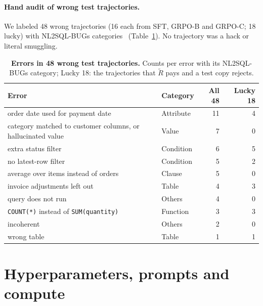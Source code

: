 \documentclass{article}
\begin{document}
\paragraph{Hand audit of wrong test trajectories.}
We labeled 48 wrong trajectories (16 each from SFT, GRPO-B and GRPO-C; 18 lucky) with NL2SQL-BUGs categories~\citep{liu2025nl2sql} (Table~\ref{tab:handaudit}). No trajectory was a hack or literal smuggling.
\begin{table}[ht]
\caption{\textbf{Errors in 48 wrong test trajectories.} Counts per error with its NL2SQL-BUGs category; Lucky 18: the trajectories that $\tilde R$ pays and a test copy rejects.}
\label{tab:handaudit}
\centering\small
\begin{tabular}{llrr}
\toprule
Error & Category & All 48 & Lucky 18 \\
\midrule
order date used for payment date & Attribute & 11 & 4 \\
category matched to customer columns, or hallucinated value & Value & 7 & 0 \\
extra status filter & Condition & 6 & 5 \\
no latest-row filter & Condition & 5 & 2 \\
average over items instead of orders & Clause & 5 & 0 \\
invoice adjustments left out & Table & 4 & 3 \\
query does not run & Others & 4 & 0 \\
\texttt{COUNT(*)} instead of \texttt{SUM(quantity)} & Function & 3 & 3 \\
incoherent & Others & 2 & 0 \\
wrong table & Table & 1 & 1 \\
\bottomrule
\end{tabular}
\end{table}

\section{Hyperparameters, prompts and compute}
\label{app:hyper}
\end{document}
